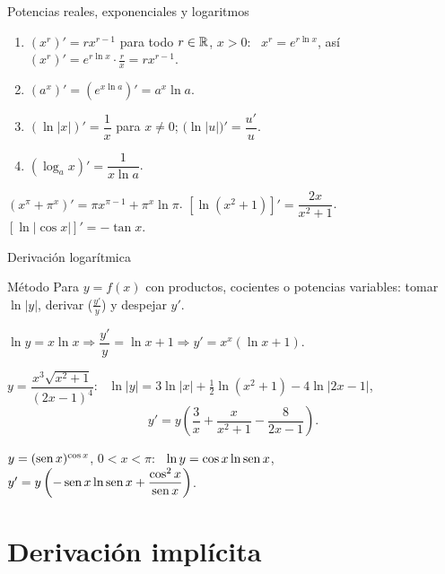\documentclass[10pt,aspectratio=169]{beamer}
\begin{document}
\begin{frame}{Potencias reales, exponenciales y logaritmos}
  \begin{teorema}
    \begin{enumerate}
      \item $(x^r)'=rx^{r-1}$ para todo $r\in\mathbb{R}$, $x>0$: \ $x^r=e^{r\ln x}$, así $(x^r)'=e^{r\ln x}\cdot\frac rx=rx^{r-1}$.
      \item $(a^x)'=(e^{x\ln a})'=a^x\ln a$.
      \item $(\ln|x|)'=\dfrac1x$ para $x\neq0$; \quad $\big(\ln|u|\big)'=\dfrac{u'}{u}$.
      \item $(\log_ax)'=\dfrac{1}{x\ln a}$.
    \end{enumerate}
  \end{teorema}
  \begin{ejemplo}[6]
    $\left(x^{\pi}+\pi^x\right)'=\pi x^{\pi-1}+\pi^x\ln\pi$. \qquad
    $\left[\ln(x^2+1)\right]'=\dfrac{2x}{x^2+1}$. \qquad $\left[\ln|\cos x|\right]'=-\tan x$.
  \end{ejemplo}
\end{frame}

\begin{frame}{Derivación logarítmica}
  \small
  \begin{block}{Método}
    Para $y=f(x)$ con productos, cocientes o potencias variables: tomar $\ln|y|$, derivar ($\frac{y'}{y}$) y despejar $y'$.
  \end{block}
  \begin{ejemplo}[7: $x^x$]
    $\ln y=x\ln x\Rightarrow\dfrac{y'}{y}=\ln x+1\Rightarrow y'=x^x(\ln x+1)$.
  \end{ejemplo}
  \begin{ejemplo}[8]
    $y=\dfrac{x^3\sqrt{x^2+1}}{(2x-1)^4}$: \ $\ln|y|=3\ln|x|+\frac12\ln(x^2+1)-4\ln|2x-1|$,
    \[ y'=y\left(\frac3x+\frac{x}{x^2+1}-\frac{8}{2x-1}\right). \]
  \end{ejemplo}
  \begin{ejemplo}[9]
    $y=(\operatorname{sen} x)^{\cos x}$, $0<x<\pi$: \ $\ln y=\cos x\ln\operatorname{sen} x$, \ $y'=y\left(-\operatorname{sen} x\ln\operatorname{sen} x+\dfrac{\cos^2x}{\operatorname{sen} x}\right)$.
  \end{ejemplo}
\end{frame}

\section{Derivación implícita}
\end{document}

